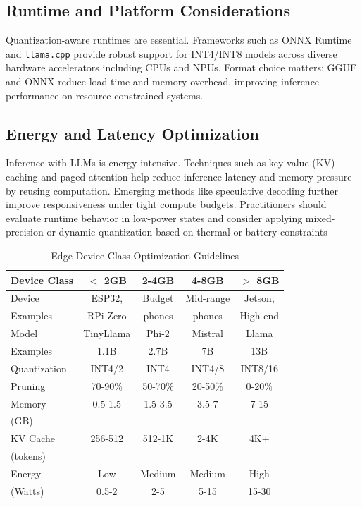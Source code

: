 \documentclass[11pt]{IEEEtran}
\begin{document}
\subsection{Runtime and Platform Considerations}
Quantization-aware runtimes are essential. Frameworks such as ONNX
Runtime and \texttt{llama.cpp} provide robust support for INT4/INT8 models across diverse hardware accelerators including CPUs and NPUs. Format choice matters: GGUF and ONNX reduce load time and memory overhead, improving inference performance on resource-constrained systems.
\subsection{Energy and Latency Optimization}
Inference with LLMs is energy-intensive. Techniques such as key-value (KV) caching and paged attention help reduce inference latency and memory pressure by reusing computation. Emerging methods like speculative decoding further
improve responsiveness under tight compute budgets. Practitioners should evaluate
runtime behavior in low-power states and consider applying mixed-precision or dynamic
quantization based on thermal or battery constraints
\renewcommand{\arraystretch}{1.5}
    \begin{table}[t]
\centering
\caption{Edge Device Class Optimization Guidelines}
\label{tab:edge_device_optimization}
\begin{tabular}{|l|c|c|c|c|}
\hline
\textbf{Device Class} & \textbf{$<$ 2GB} & \textbf{2-4GB} & \textbf{4-8GB} & \textbf{$>$ 8GB} \\
\hline
\hline
Device & ESP32, & Budget & Mid-range & Jetson, \\
Examples & RPi Zero & phones & phones & High-end \\
\hline
Model & TinyLlama & Phi-2 & Mistral & Llama \\
Examples & 1.1B & 2.7B & 7B & 13B \\
\hline
Quantization & INT4/2 & INT4 & INT4/8 & INT8/16 \\
\hline
Pruning & 70-90\% & 50-70\% & 20-50\% & 0-20\% \\
\hline
Memory & 0.5-1.5 & 1.5-3.5 & 3.5-7 & 7-15 \\
(GB) & & & & \\
\hline
KV Cache & 256-512 & 512-1K & 2-4K & 4K+ \\
(tokens) & & & & \\
\hline
Energy & Low & Medium & Medium & High \\
(Watts) & 0.5-2 & 2-5 & 5-15 & 15-30 \\
\hline
\end{tabular}
\end{table}
\end{document}
